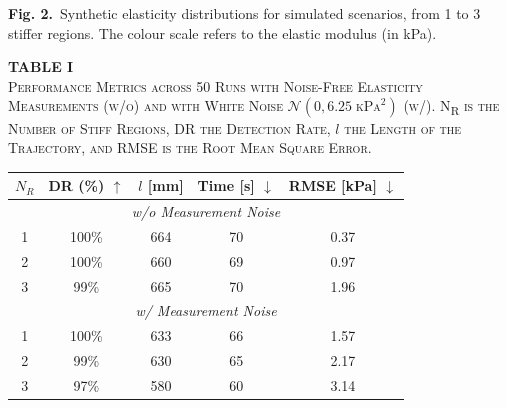 \documentclass[11pt]{article}
\begin{document}
\begin{center}
\end{center}

\vspace{0.4em}

\textbf{Fig. 2.}\ Synthetic elasticity distributions for simulated
scenarios, from 1 to 3 stiffer regions. The colour scale refers to
the elastic modulus (in kPa).

\vspace{0.8em}

\begin{center}
\textbf{TABLE I}\\[2pt]
\textsc{Performance Metrics across 50 Runs with Noise-Free Elasticity
Measurements (w/o) and with White Noise $\mathcal{N}(0, 6.25\;
\mathrm{kPa}^{2})$ (w/). N\textsubscript{R} is the Number of Stiff
Regions, DR the Detection Rate, $l$ the Length of the Trajectory, and
RMSE is the Root Mean Square Error.}
\end{center}

\begin{center}
\footnotesize
\begin{tabular}{|c|c|c|c|c|}
\hline
$N_{R}$ & DR (\%) $\uparrow$ & $l$ [mm] & Time [s] $\downarrow$ &
RMSE [kPa] $\downarrow$ \\
\hline
\multicolumn{5}{|c|}{\textit{w/o Measurement Noise}} \\
\hline
1 & 100\% & 664 & 70 & 0.37 \\
2 & 100\% & 660 & 69 & 0.97 \\
3 & 99\%  & 665 & 70 & 1.96 \\
\hline
\multicolumn{5}{|c|}{\textit{w/ Measurement Noise}} \\
\hline
1 & 100\% & 633 & 66 & 1.57 \\
2 & 99\%  & 630 & 65 & 2.17 \\
3 & 97\%  & 580 & 60 & 3.14 \\
\hline
\end{tabular}
\end{center}
\end{document}
